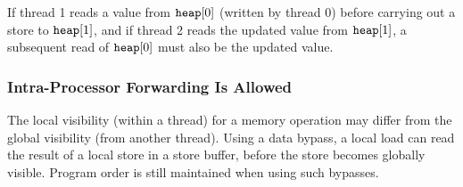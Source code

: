 \begin{table}[!hbt]
\noindent{}
\caption{Stores Are Transitively Visible \cite[Example 7]{ref:AMD}}
\label{tbl:litmus:amd:7}
\end{table}

\noindent
If thread 1 reads a value from $\texttt{heap}[0]$ (written by thread 0) before carrying out a store to $\texttt{heap}[1]$, and if thread 2 reads the updated value from $\texttt{heap}[1]$, a subsequent read of $\texttt{heap}[0]$ must also be the updated value.

\subsubsection*{Intra-Processor Forwarding Is Allowed}

The local visibility (within a thread) for a memory operation may differ from the global visibility (from another thread).
Using a data bypass, a local load can read the result of a local store in a store buffer, before the store becomes globally visible.
Program order is still maintained when using such bypasses.

